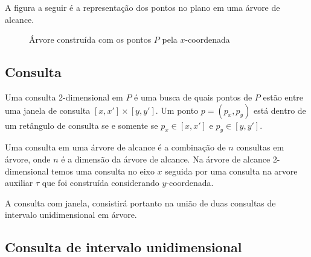 A figura a seguir é a representação dos pontos no plano em uma árvore de alcance.
\begin{figure}[h!]

 \caption{Árvore construída com os pontos $P$ pela $x$-coordenada}
\end{figure}

\subsection{Consulta}

Uma consulta 2-dimensional em $P$ é uma busca de quais pontos de $P$ estão entre uma janela de consulta
$[x, x'] \times [y, y']$. Um ponto $p = (p_x, p_y)$ está dentro de um retângulo de consulta se e somente
se $p_x \in [x, x']$ e $p_y \in [y, y']$. \cite{cg_rt1}

Uma consulta em uma árvore de alcance é a combinação de $n$ consultas em árvore, onde $n$ é a dimensão
da árvore de alcance.
Na árvore de alcance 2-dimensional temos uma consulta no eixo $x$ seguida por uma consulta na arvore 
auxiliar $\tau$ que foi construída considerando $y$-coordenada.

A consulta com janela, consistirá portanto na união de duas consultas de intervalo unidimensional em
árvore.

\subsection{Consulta de intervalo unidimensional}

